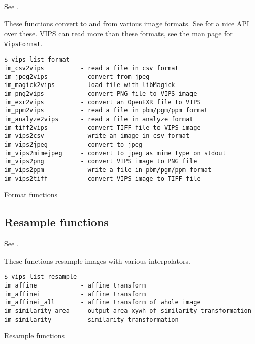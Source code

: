 See .

These functions convert to and from various image formats. See
 for a nice API over these. VIPS can read more than these
formats, see the man page for \verb+VipsFormat+.

\begin{fig2}
\begin{verbatim}
$ vips list format
im_csv2vips          - read a file in csv format
im_jpeg2vips         - convert from jpeg
im_magick2vips       - load file with libMagick
im_png2vips          - convert PNG file to VIPS image
im_exr2vips          - convert an OpenEXR file to VIPS
im_ppm2vips          - read a file in pbm/pgm/ppm format
im_analyze2vips      - read a file in analyze format
im_tiff2vips         - convert TIFF file to VIPS image
im_vips2csv          - write an image in csv format
im_vips2jpeg         - convert to jpeg
im_vips2mimejpeg     - convert to jpeg as mime type on stdout
im_vips2png          - convert VIPS image to PNG file
im_vips2ppm          - write a file in pbm/pgm/ppm format
im_vips2tiff         - convert VIPS image to TIFF file
\end{verbatim}
\caption{Format functions}
\label{fg:format}
\end{fig2}

\subsection{Resample functions}

See .

These functions resample images with various interpolators.

\begin{fig2}
\begin{verbatim}
$ vips list resample
im_affine            - affine transform
im_affinei           - affine transform
im_affinei_all       - affine transform of whole image
im_similarity_area   - output area xywh of similarity transformation
im_similarity        - similarity transformation
\end{verbatim}
\caption{Resample functions}
\label{fg:resample}
\end{fig2}
